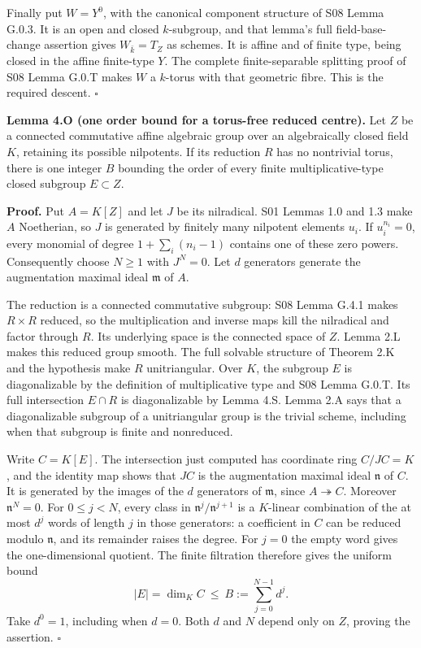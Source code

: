 \documentclass[11pt,a4paper,openany]{report}
\begin{document}
Finally put \(W=Y^0\), with the canonical component structure of S08 Lemma G.0.3. It is an open and closed \(k\)-subgroup, and that lemma's full field-base-change assertion gives \(W_{\bar k}=T_Z\) as schemes. It is affine and of finite type, being closed in the affine finite-type \(Y\). The complete finite-separable splitting proof of S08 Lemma G.0.T makes \(W\) a \(k\)-torus with that geometric fibre. This is the required descent. \(\square\)

\label{AG-RG-01-central-kernel-order-and-finite-field-tori}

\textbf{Lemma 4.O (one order bound for a torus-free reduced centre).} Let \(Z\) be a connected commutative affine algebraic group over an algebraically closed field \(K\), retaining its possible nilpotents. If its reduction \(R\) has no nontrivial torus, there is one integer \(B\) bounding the order of every finite multiplicative-type closed subgroup \(E\subset Z\).

\textbf{Proof.} Put \(A=K[Z]\) and let \(J\) be its nilradical. S01 Lemmas 1.0 and 1.3 make \(A\) Noetherian, so \(J\) is generated by finitely many nilpotent elements \(u_i\). If \(u_i^{n_i}=0\), every monomial of degree \(1+\sum_i(n_i-1)\) contains one of these zero powers. Consequently choose \(N\ge1\) with \(J^N=0\). Let \(d\) generators generate the augmentation maximal ideal \(\mathfrak m\) of \(A\).

The reduction is a connected commutative subgroup: S08 Lemma G.4.1 makes \(R\times R\) reduced, so the multiplication and inverse maps kill the nilradical and factor through \(R\). Its underlying space is the connected space of \(Z\). Lemma 2.L makes this reduced group smooth. The full solvable structure of Theorem 2.K and the hypothesis make \(R\) unitriangular. Over \(K\), the subgroup \(E\) is diagonalizable by the definition of multiplicative type and S08 Lemma G.0.T. Its full intersection \(E\cap R\) is diagonalizable by Lemma 4.S. Lemma 2.A says that a diagonalizable subgroup of a unitriangular group is the trivial scheme, including when that subgroup is finite and nonreduced.

Write \(C=K[E]\). The intersection just computed has coordinate ring \(C/JC=K\), and the identity map shows that \(JC\) is the augmentation maximal ideal \(\mathfrak n\) of \(C\). It is generated by the images of the \(d\) generators of \(\mathfrak m\), since \(A\twoheadrightarrow C\). Moreover \(\mathfrak n^N=0\). For \(0\le j<N\), every class in \(\mathfrak n^j/\mathfrak n^{j+1}\) is a \(K\)-linear combination of the at most \(d^j\) words of length \(j\) in those generators: a coefficient in \(C\) can be reduced modulo \(\mathfrak n\), and its remainder raises the degree. For \(j=0\) the empty word gives the one-dimensional quotient. The finite filtration therefore gives the uniform bound \[
 |E|=\dim_K C\ \le\ B:=\sum_{j=0}^{N-1}d^j.
\] Take \(d^0=1\), including when \(d=0\). Both \(d\) and \(N\) depend only on \(Z\), proving the assertion. \(\square\)
\end{document}
